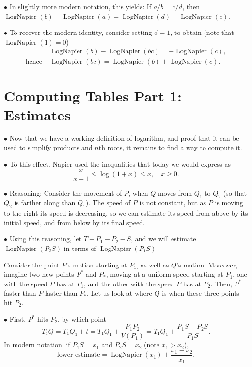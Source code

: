 \documentclass{article}
\newcommand\point[1]{\noindent \hspace{\labelsep} $\bullet$ #1 \smallskip}
\DeclareMathOperator{\lognap}{LogNapier}
\begin{document}
\point{In slightly more modern notation, this yields: If $a/b = c/d$, then $\lognap(b)-\lognap(a) = \lognap(d)-\lognap(c)$.}

\point{To recover the modern identity, consider setting $d = 1$, to obtain (note that $\lognap(1) = 0$)
\begin{align}
&\lognap(b) - \lognap(bc) = -\lognap(c),\\
\text{hence } &\lognap(bc) = \lognap(b) + \lognap(c).
\end{align}}

\section{Computing Tables Part 1: Estimates}

\point{Now that we have a working definition of logarithm, and proof that it can be used to simplify products and $n$th roots, it remains to find a way to compute it.}

\point{To this effect, Napier used the inequalities that today we would express as
\begin{equation}
\frac x{x+1} \leq \log(1+x) \leq x, \quad x \geq 0.
\end{equation}}

\point{Reasoning: Consider the movement of $P$, when $Q$ moves from $Q_1$ to $Q_2$ (so that $Q_2$ is farther along than $Q_1$). The speed of $P$ is not constant, but as $P$ is moving to the right its speed is decreasing, so we can estimate its speed from above by its initial speed, and from below by its final speed.}

\point{Using this reasoning, let $T-P_1-P_2-S$, and we will estimate $\lognap(P_2 S)$ in terms of $\lognap(P_1 S)$.

Consider the point $P$'s motion starting at $P_1$, as well as $Q$'s motion. Moreover, imagine two new points $P^*$ and $P_*$, moving at a uniform speed starting at $P_1$, one with the speed $P$ has at $P_1$, and the other with the speed $P$ has at $P_2$. Then, $P^*$ faster than $P$ faster than $P_*$. Let us look at where $Q$ is when these three points hit $P_2$.}

\point{First, $P^*$ hits $P_2$, by which point
\begin{equation}
T_1 Q = T_1 Q_1 + t = T_1 Q_1 + \frac{P_1 P_2}{V(P_1)} = T_1 Q_1 + \frac{P_1 S -  P_2 S}{P_1 S}.
\end{equation}
In modern notation, if $P_1 S = x_1$ and $P_2 S = x_2$ (note $x_1 > x_2$),
\begin{equation}
\text{lower estimate} = \lognap(x_1) + \frac{x_1 - x_2}{x_1}.
\end{equation}}
\end{document}
